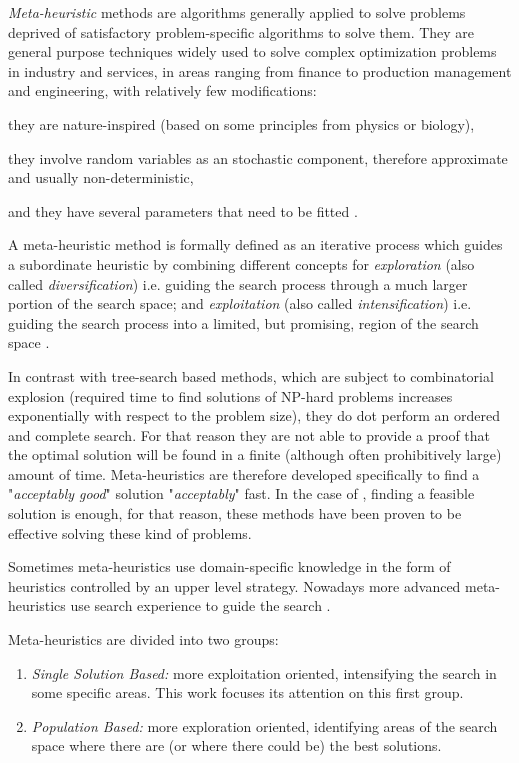 {\it Meta-heuristic} methods are algorithms generally applied to solve problems deprived of satisfactory problem-specific algorithms to solve them. They are general purpose techniques widely used to solve complex optimization problems in industry and services, in areas ranging from finance to production management and engineering, with relatively few modifications: \begin{inparaenum}[i)] \item they are nature-inspired (based on some principles from physics or biology), \item they involve random variables as an stochastic component, therefore approximate and usually non-deterministic, \item and they have several parameters that need to be fitted \cite{Dreo2006}.\end{inparaenum} 

A meta-heuristic method is formally defined as an iterative process which guides a subordinate heuristic by combining different concepts for \textit{exploration} (also called \textit{diversification}) i.e. guiding the search process through a much larger portion of the search space; and \textit{exploitation} (also called \textit{intensification}) i.e. guiding the search process into a limited, but promising, region of the search space \cite{Osman1996}.

In contrast with tree-search based methods, which are subject to combinatorial explosion (required time to find solutions of NP-hard problems increases exponentially with respect to the problem size), they do dot perform an ordered and complete search. For that reason they are not able to provide a proof that the optimal solution will be found in a finite (although often prohibitively large) amount of time. Meta-heuristics are therefore developed specifically to find a "\textit{acceptably good}" solution "\textit{acceptably}" fast. In the case of \csps, finding a feasible solution is enough, for that reason, these methods have been proven to be effective solving these kind of problems.

Sometimes meta-heuristics use domain-specific knowledge in the form of heuristics controlled by an upper level strategy. Nowadays more advanced meta-heuristics use search experience to guide the search \cite{Blum2003}.

Meta-heuristics are divided into two groups: %
\begin{enumerate}%
    \item {\it Single Solution Based:} more exploitation oriented, intensifying the search in some specific areas. This work focuses its attention on this first group.
    \item {\it Population Based:} more exploration oriented, identifying areas of the search space where there are (or where there could be) the best solutions. %
\end{enumerate} %

